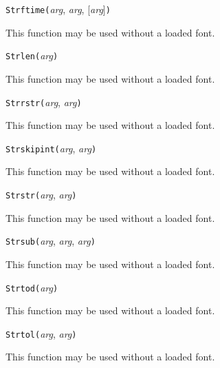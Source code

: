 \texttt{Strftime(}\textit{arg}, \textit{arg}, [\textit{arg}]\texttt{)}

This function may be used without a loaded font.



\texttt{Strlen(}\textit{arg}\texttt{)}

This function may be used without a loaded font.



\texttt{Strrstr(}\textit{arg}, \textit{arg}\texttt{)}

This function may be used without a loaded font.



\texttt{Strskipint(}\textit{arg}, \textit{arg}\texttt{)}

This function may be used without a loaded font.



\texttt{Strstr(}\textit{arg}, \textit{arg}\texttt{)}

This function may be used without a loaded font.



\texttt{Strsub(}\textit{arg}, \textit{arg}, \textit{arg}\texttt{)}

This function may be used without a loaded font.



\texttt{Strtod(}\textit{arg}\texttt{)}

This function may be used without a loaded font.



\texttt{Strtol(}\textit{arg}, \textit{arg}\texttt{)}

This function may be used without a loaded font.



